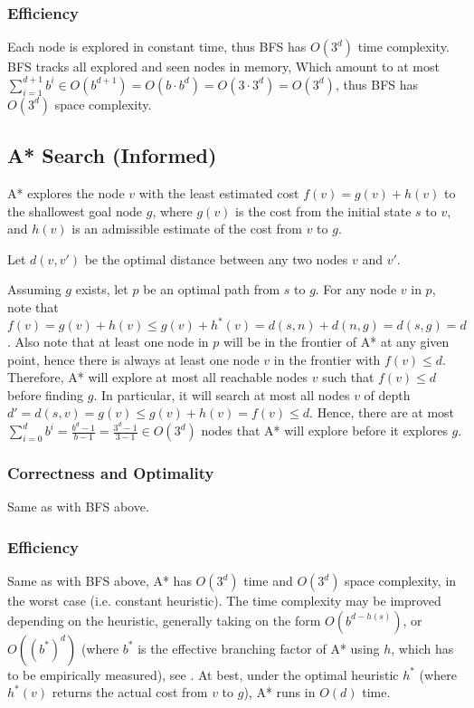 \documentclass[runningheads]{llncs}
\begin{document}
\subsubsection{Efficiency}
Each node is explored in constant time, thus BFS has $O(3^d)$ time complexity. BFS tracks all explored and seen nodes in memory, Which amount to at most $\sum_{i=1}^{d+1} b^i \in O(b^{d+1}) = O(b \cdot b^d) = O(3 \cdot 3^d) = O(3^d)$, thus BFS has $O(3^d)$ space complexity.

\subsection{A* Search (Informed)}

A* explores the node $v$ with the least estimated cost $f(v) = g(v) + h(v)$ to the shallowest goal node $g$, where $g(v)$ is the cost from the initial state $s$ to $v$, and $h(v)$ is an admissible estimate of the cost from $v$ to $g$.

Let $d(v,v')$ be the optimal distance between any two nodes $v$ and $v'$.

Assuming $g$ exists, let $p$ be an optimal path from $s$ to $g$. For any node $v$ in $p$, note that $f(v) = g(v) + h(v) \leq g(v) + h^\ast(v) = d(s,n)+d(n,g) = d(s,g) = d$. Also note that at least one node in $p$ will be in the frontier of A* at any given point, hence there is always at least one node $v$ in the frontier with $f(v) \leq d$. Therefore, A* will explore at most all reachable nodes $v$ such that $f(v) \leq d$ before finding $g$. In particular, it will search at most all nodes $v$ of depth $d' = d(s,v) = g(v) \leq g(v)+h(v) = f(v) \leq d$. Hence, there are at most $\sum_{i=0}^d b^i = \frac{b^d-1}{b-1} = \frac{3^d-1}{3-1} \in O(3^d)$ nodes that A* will explore before it explores $g$.

\subsubsection{Correctness and Optimality}
Same as with BFS above.

\subsubsection{Efficiency}
Same as with BFS above, A* has $O(3^d)$ time and $O(3^d)$ space complexity, in the worst case (i.e. constant heuristic). The time complexity may be improved depending on the heuristic, generally taking on the form $O(b^{d-h(s)})$, or $O((b^\ast)^d)$ (where $b^\ast$ is the effective branching factor of A* using $h$, which has to be empirically measured), see \cite{AIMA-A*Complexity}. At best, under the optimal heuristic $h^\ast$ (where $h^\ast(v)$ returns the actual cost from $v$ to $g$), A* runs in $O(d)$ time.
\end{document}
